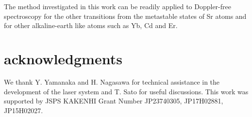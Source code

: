 \documentclass[twocolumn,10pt,a4paper]{article}
\begin{document}
The method investigated in this work can be readily applied to Doppler-free spectroscopy for the other transitions from the metastable states of Sr atoms and for other alkaline-earth like atoms such as Yb, Cd and Er.

\section{acknowledgments}
We thank Y. Yamanaka and H. Nagasawa for technical assistance in the development of the laser system and T. Sato for useful discussions. This work was supported by JSPS KAKENHI Grant Number JP23740305, JP17H02881, JP15H02027.


\end{document}
